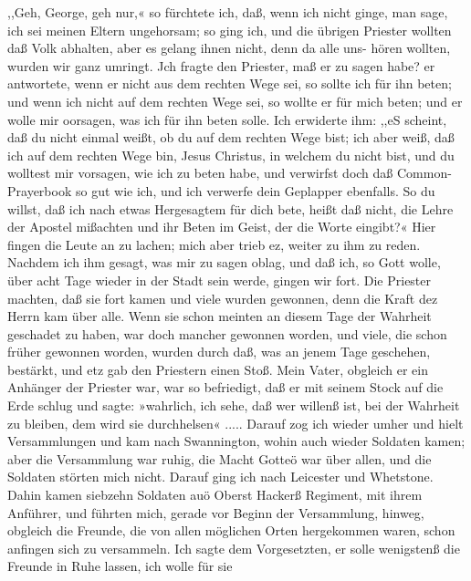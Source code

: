 ,,Geh, George, geh nur,« so fürchtete ich, daß, wenn ich nicht
ginge, man sage, ich sei meinen Eltern ungehorsam; so ging ich,
und die übrigen Priester wollten daß Volk abhalten, aber es
gelang ihnen nicht, denn da alle uns- hören wollten, wurden wir
ganz umringt. Jch fragte den Priester, maß er zu sagen habe?
er antwortete, wenn er nicht aus dem rechten Wege sei, so sollte
ich für ihn beten; und wenn ich nicht auf dem rechten Wege sei,
so wollte er für mich beten; und er wolle mir oorsagen, was ich
für ihn beten solle. Ich erwiderte ihm: ,,eS scheint, daß du nicht
einmal weißt, ob du auf dem rechten Wege bist; ich aber weiß,
daß ich auf dem rechten Wege bin, Jesus Christus, in welchem
du nicht bist, und du wolltest mir vorsagen, wie ich zu beten
habe, und verwirfst doch daß Common-Prayerbook so gut wie ich,
und ich verwerfe dein Geplapper ebenfalls. So du willst, daß ich
nach etwas Hergesagtem für dich bete, heißt daß nicht, die Lehre
der Apostel mißachten und ihr Beten im Geist, der die Worte
eingibt?« Hier fingen die Leute an zu lachen; mich aber trieb
ez, weiter zu ihm zu reden. Nachdem ich ihm gesagt, was
mir zu sagen oblag, und daß ich, so Gott wolle, über acht Tage wieder
in der Stadt sein werde, gingen wir fort. Die Priester machten,
daß sie fort kamen und viele wurden gewonnen, denn die Kraft dez
Herrn kam über alle. Wenn sie schon meinten an diesem Tage
der Wahrheit geschadet zu haben, war doch mancher gewonnen
worden, und viele, die schon früher gewonnen worden, wurden durch
daß, was an jenem Tage geschehen, bestärkt, und etz gab den
Priestern einen Stoß. Mein Vater, obgleich er ein Anhänger der
Priester war, war so befriedigt, daß er mit seinem Stock auf die
Erde schlug und sagte: »wahrlich, ich sehe, daß wer willenß ist,
bei der Wahrheit zu bleiben, dem wird sie durchhelsen« .....
Darauf zog ich wieder umher und hielt Versammlungen und
kam nach Swannington, wohin auch wieder Soldaten kamen;
aber die Versammlung war ruhig, die Macht Gotteö war
über allen, und die Soldaten störten mich nicht. Darauf ging
ich nach Leicester und Whetstone. Dahin kamen siebzehn Soldaten
auö Oberst Hackerß Regiment, mit ihrem Anführer, und führten
mich, gerade vor Beginn der Versammlung, hinweg, obgleich die
Freunde, die von allen möglichen Orten hergekommen waren,
schon anfingen sich zu versammeln. Ich sagte dem Vorgesetzten,
er solle wenigstenß die Freunde in Ruhe lassen, ich wolle für sie


